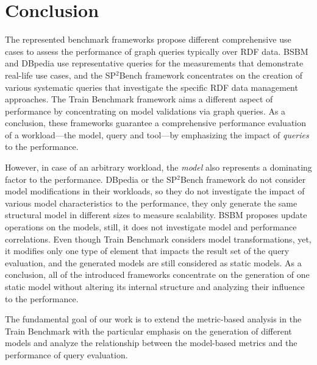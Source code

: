 \section{Conclusion} \label{sec:benchmark_conclusions}

The represented benchmark frameworks propose different comprehensive use cases to assess the performance of graph queries typically over RDF data. BSBM and DBpedia use representative queries for the measurements that demonstrate real-life use cases, and the SP$^2$Bench framework concentrates on the creation of various systematic queries that investigate the specific RDF data management approaches. The Train Benchmark framework aims a different aspect of performance by concentrating on model validations via graph queries. As a conclusion, these frameworks guarantee a comprehensive performance evaluation of a workload---the model, query and tool---by emphasizing the impact of \textit{queries} to the performance.

However, in case of an arbitrary workload, the \textit{model} also represents a dominating factor to the performance. DBpedia or the SP$^2$Bench framework do not consider model modifications in their workloads, so they do not investigate the impact of various model characteristics to the performance, they only generate the same structural model in different sizes to measure scalability. BSBM proposes update operations on the models, still, it does not investigate model and performance correlations. Even though Train Benchmark considers model transformations, yet, it modifies only one type of element that impacts the result set of the query evaluation, and the generated models are still considered as static models. As a conclusion, all of the introduced frameworks concentrate on the generation of one static model without altering its internal structure and analyzing their influence to the performance.

The fundamental goal of our work is to extend the metric-based analysis in the Train Benchmark with the particular emphasis on the generation of different models and analyze the relationship between the model-based metrics and the performance of query evaluation.

